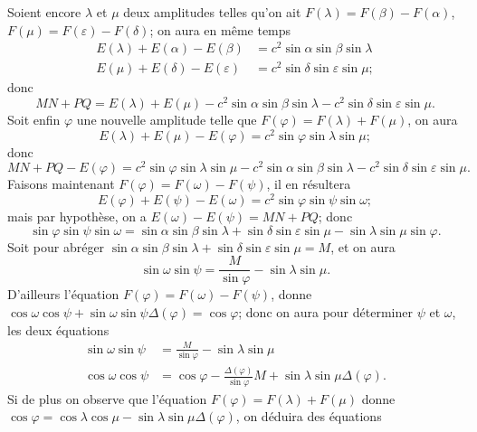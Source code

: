 \documentclass{article}
\begin{document}
Soient encore $\lambda$ et $\mu$ deux amplitudes telles qu'on ait $F(\lambda)=F(\beta)-F(\alpha)$, $F(\mu)=F(\varepsilon)-F(\delta)$; on aura en même temps
\[ \begin{aligned} E(\lambda)+E(\alpha)-E(\beta)&=c^{2}\sin\alpha\sin\beta\sin\lambda\\ E(\mu)+E(\delta)-E(\varepsilon)&=c^{2}\sin\delta\sin\varepsilon\sin\mu; \end{aligned} \]
donc
\[ MN+PQ=E(\lambda)+E(\mu)-c^{2}\sin\alpha\sin\beta\sin\lambda-c^{2}\sin\delta\sin\varepsilon\sin\mu. \]
Soit enfin $\varphi$ une nouvelle amplitude telle que $F(\varphi)=F(\lambda)+F(\mu)$, on aura
\[ E(\lambda)+E(\mu)-E(\varphi)=c^{2}\sin\varphi\sin\lambda\sin\mu; \]
donc
\[ MN+PQ-E(\varphi)=c^{2}\sin\varphi\sin\lambda\sin\mu-c^{2}\sin\alpha\sin\beta\sin\lambda-c^{2}\sin\delta\sin\varepsilon\sin\mu. \]
Faisons maintenant $F(\varphi)=F(\omega)-F(\psi)$, il en résultera
\[ E(\varphi)+E(\psi)-E(\omega)=c^{2}\sin\varphi\sin\psi\sin\omega; \]
mais par hypothèse, on a $E(\omega)-E(\psi)=MN+PQ$; donc
\[ \sin\varphi\sin\psi\sin\omega=\sin\alpha\sin\beta\sin\lambda+\sin\delta\sin\varepsilon\sin\mu-\sin\lambda\sin\mu\sin\varphi. \]
Soit pour abréger $\sin\alpha\sin\beta\sin\lambda+\sin\delta\sin\varepsilon\sin\mu=M$, et on aura
\[ \sin\omega\sin\psi=\frac{M}{\sin\varphi}-\sin\lambda\sin\mu. \]
D'ailleurs l'équation $F(\varphi)=F(\omega)-F(\psi)$, donne $\cos\omega\cos\psi+\sin\omega\sin\psi\Delta(\varphi)=\cos\varphi$; donc on aura pour déterminer $\psi$ et $\omega$, les deux équations
\[ \begin{aligned} \sin\omega\sin\psi&=\frac{M}{\sin\varphi}-\sin\lambda\sin\mu\\ \cos\omega\cos\psi&=\cos\varphi-\frac{\Delta(\varphi)}{\sin\varphi}M+\sin\lambda\sin\mu\Delta(\varphi). \end{aligned} \]
Si de plus on observe que l'équation $F(\varphi)=F(\lambda)+F(\mu)$ donne $\cos\varphi=\cos\lambda\cos\mu-\sin\lambda\sin\mu\Delta(\varphi)$, on déduira des équations
\end{document}
